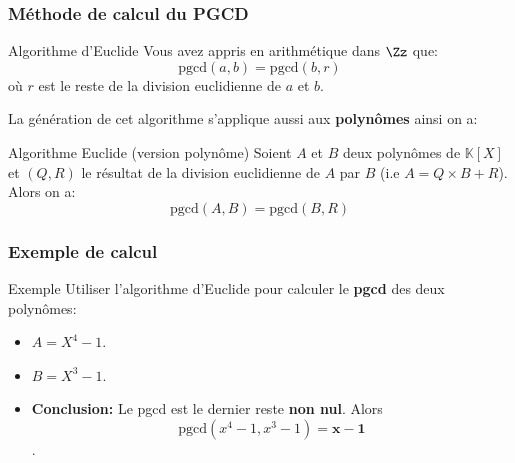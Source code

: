 \documentclass{beamer}
\newcommand{\setK}{\mathbb{K}}
\begin{document}
\begin{frame}[t]
  \frametitle{Méthode de calcul du PGCD}
 \begin{block}{Algorithme d'Euclide}
   \small
   Vous avez appris en arithmétique dans $\Zz$ que:
   \begin{equation}
     \text{pgcd}(a, b) = \text{pgcd}(b, r)
   \end{equation}
   où $r$ est le reste de la division euclidienne de $a$ et $b$.
 \end{block} 

 La génération de cet algorithme s'applique aussi aux \textbf{\alert{polynômes}}
 ainsi on a:

 \begin{block}{Algorithme Euclide (version polynôme)}
   \small
   Soient $A$ et $B$ deux polynômes de $\setK[X]$ et $(Q, R)$ le résultat de la
   division euclidienne de $A$ par $B$ (i.e \alert{$A = Q\times B + R$}). Alors on a:
\pause
   \begin{equation}
     \text{pgcd}( A, B)  = \text{pgcd}( B, R)
   \end{equation}
 \end{block}
\end{frame}
\begin{frame}[t]
  \frametitle{Exemple de calcul}
  \begin{block}{Exemple}
Utiliser l'algorithme d'Euclide pour calculer le \textbf{pgcd} des deux
polynômes: 
\begin{itemize}
  \small
  \item $ A = X^4 -1$.
  \item $ B = X^3 - 1$.
\end{itemize}
\end{block}
\begin{center}
\end{center}
\pause
\begin{itemize}
  \item \textbf{\alert{Conclusion:}}  Le pgcd est le dernier reste \textbf{non
    nul}. Alors $$\text{pgcd}(x^4-1, x^3-1) = \mathbf{x-1}$$. 
\end{itemize}
\end{frame}
\end{document}
